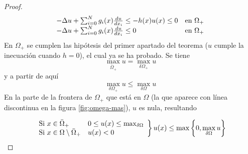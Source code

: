 \begin{proof}
\begin{equation*}
\begin{array}{l l}
-\Delta u + \sum_{i=0}^Ng_i(x)\frac{du}{dx_i} \le -h(x)u(x) \le 0 & \text{en } \Omega_+\\
-\Delta u + \sum_{i=0}^Ng_i(x)\frac{du}{dx_i} \le 0 & \text{en } \Omega_+\\
\end{array}
\end{equation*}
En $\Omega_+$ se cumplen las hipótesis del primer apartado del teorema ($u$ cumple la inecuación cuando $h=0$), el cual ya se ha probado. Se tiene
$$\max_{\bar{\Omega}_+}u = \max_{\delta\Omega_+}u$$
y a partir de aquí
$$\max_{\delta\Omega_+}u \le \max_{\delta\Omega}u $$
En la parte de la frontera de $\Omega_+$ que está en $\Omega$ (la que aparece con línea discontinua en la figura \ref{fig:omega-mas}), $u$ es nula, resultando

\begin{equation*}
\left.
\begin{array}{l l}
\text{Si } x\in\bar{\Omega}_+ & 0\le u(x)\le \max_{\delta\Omega}\\
\text{Si } x\in\Omega\setminus\bar{\Omega}_+ & u(x) < 0
\end{array}
\right\}
u(x) \le \max\left\{0, \max_{\delta\Omega} u\right\}
\end{equation*}

\end{proof}

